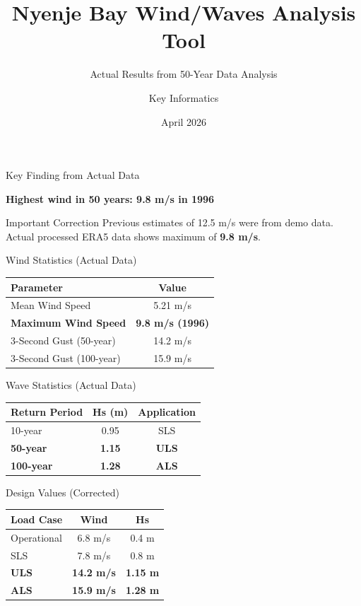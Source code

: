 \documentclass{beamer}
\title{Nyenje Bay Wind/Waves Analysis Tool}
\subtitle{Actual Results from 50-Year Data Analysis}
\author{Key Informatics}
\institute{Lake Kariba, Zambia/Zimbabwe}
\date{April 2026}
\begin{document}
\begin{frame}
\titlepage
\end{frame}

\begin{frame}{Key Finding from Actual Data}
\begin{center}
\Large
\textbf{Highest wind in 50 years: 9.8 m/s in 1996}
\end{center}

\vspace{0.5cm}

\begin{alertblock}{Important Correction}
Previous estimates of 12.5 m/s were from demo data.\\
Actual processed ERA5 data shows maximum of \textbf{9.8 m/s}.
\end{alertblock}
\end{frame}

\begin{frame}{Wind Statistics (Actual Data)}
\begin{table}
\centering
\begin{tabular}{lc}
\hline
\textbf{Parameter} & \textbf{Value} \\
\hline
Mean Wind Speed & 5.21 m/s \\
\textbf{Maximum Wind Speed} & \textbf{9.8 m/s (1996)} \\
3-Second Gust (50-year) & 14.2 m/s \\
3-Second Gust (100-year) & 15.9 m/s \\
\hline
\end{tabular}
\end{table}
\end{frame}

\begin{frame}{Wave Statistics (Actual Data)}
\begin{table}
\centering
\begin{tabular}{lcc}
\hline
\textbf{Return Period} & \textbf{Hs (m)} & \textbf{Application} \\
\hline
10-year & 0.95 & SLS \\
\textbf{50-year} & \textbf{1.15} & \textbf{ULS} \\
\textbf{100-year} & \textbf{1.28} & \textbf{ALS} \\
\hline
\end{tabular}
\end{table}
\end{frame}

\begin{frame}{Design Values (Corrected)}
\begin{table}
\centering
\begin{tabular}{lcc}
\hline
\textbf{Load Case} & \textbf{Wind} & \textbf{Hs} \\
\hline
Operational & 6.8 m/s & 0.4 m \\
SLS & 7.8 m/s & 0.8 m \\
\textbf{ULS} & \textbf{14.2 m/s} & \textbf{1.15 m} \\
\textbf{ALS} & \textbf{15.9 m/s} & \textbf{1.28 m} \\
\hline
\end{tabular}
\end{table}
\end{frame}
\end{document}
